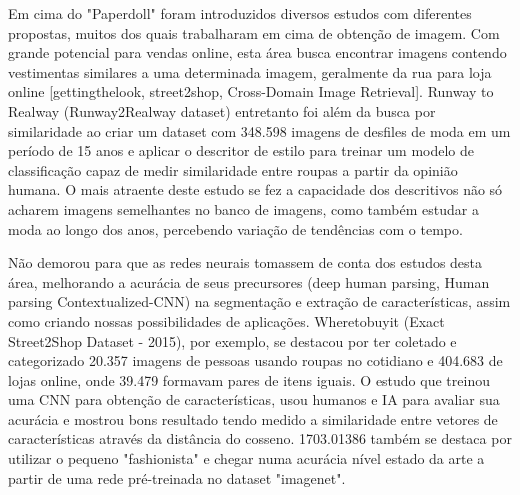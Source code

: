 \documentclass[12pt]{report}
\begin{document}


Em cima do "Paperdoll" foram introduzidos diversos estudos com diferentes propostas, muitos dos quais trabalharam em cima de obtenção de imagem. Com grande potencial para vendas online, esta área busca encontrar imagens contendo vestimentas similares a uma determinada imagem, geralmente da rua para loja online [gettingthelook, street2shop, Cross-Domain Image Retrieval]. Runway to Realway (Runway2Realway dataset) entretanto foi além da busca por similaridade ao criar um dataset com 348.598 imagens de desfiles de moda em um período de 15 anos e aplicar o descritor de estilo para treinar um modelo de classificação capaz de medir similaridade entre roupas a partir da opinião humana. O mais atraente deste estudo se fez a capacidade dos descritivos não só acharem imagens semelhantes no banco de imagens, como também estudar a moda ao longo dos anos, percebendo variação de tendências com o tempo. 

Não demorou para que as redes neurais tomassem de conta dos estudos desta área, melhorando a acurácia de seus precursores (deep human parsing, Human parsing Contextualized-CNN) na segmentação e extração de características, assim como criando nossas possibilidades de aplicações. Wheretobuyit (Exact Street2Shop Dataset - 2015), por exemplo, se destacou por ter coletado e categorizado 20.357 imagens de pessoas usando roupas no cotidiano e 404.683 de lojas online, onde 39.479 formavam pares de itens iguais. O estudo que treinou uma CNN para obtenção de características, usou humanos e IA para avaliar sua acurácia e mostrou bons resultado tendo medido a similaridade entre vetores de características através da distância do cosseno. 1703.01386 também se destaca por utilizar o pequeno "fashionista" e chegar numa acurácia nível estado da arte a partir de uma rede pré-treinada no dataset "imagenet". 
\end{document}
